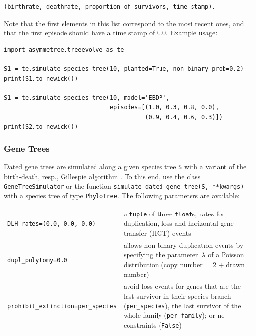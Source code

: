 \documentclass[hidelinks,11pt]{article}
\newcommand{\sq}{\textquotesingle}
\begin{document}
\begin{adjustwidth}{1cm}{1cm}\vspace{2mm}
\begin{verbatim}
(birthrate, deathrate, proportion_of_survivors, time_stamp).
\end{verbatim}
\end{adjustwidth}

\noindent
Note that the first elements in this list correspond to the most recent ones, and that the first episode should have a time stamp of 0.0.
Example usage:

\begin{adjustwidth}{1cm}{1cm}\vspace{2mm}
\begin{verbatim}
import asymmetree.treeevolve as te

S1 = te.simulate_species_tree(10, planted=True, non_binary_prob=0.2)
print(S1.to_newick())

S1 = te.simulate_species_tree(10, model='EBDP',
                              episodes=[(1.0, 0.3, 0.8, 0.0),
                                        (0.9, 0.4, 0.6, 0.3)])
print(S2.to_newick())
\end{verbatim}
\end{adjustwidth}


\subsubsection{Gene Trees}

Dated gene trees are simulated along a given species tree \texttt{S} with a variant of the birth-death, resp., Gillespie algorithm \citep{kendall1948,gillespie1976}.
To this end, use the class \texttt{GeneTreeSimulator} or the function \texttt{simulate\_dated\_gene\_tree(S, **kwargs)} with a species tree of type \texttt{PhyloTree}.
The following parameters are available:

\vspace{3mm}
{\small\centering
\begin{longtable}{ p{4.0cm} p{9cm} }
	\texttt{DLH\_rates=\newline (0.0, 0.0, 0.0)} & a \texttt{tuple} of three \texttt{float}s, rates for duplication, loss and horizontal gene transfer (HGT) events\\
	\texttt{dupl\_polytomy=0.0}  & allows non-binary duplication events by specifying
	the parameter~$\lambda$ of a Poisson distribution (copy number = 2 + drawn number)\\
	\texttt{prohibit\_extinction=\newline \sq per\_species\sq}  & avoid loss
	events for genes that are the last survivor in their species branch
	(\texttt{\sq per\_species\sq}), the last survivor of the whole family
	(\texttt{\sq per\_family\sq}); or no constraints  (\texttt{False})
\end{longtable}
}
\vspace{3mm}
\end{document}
